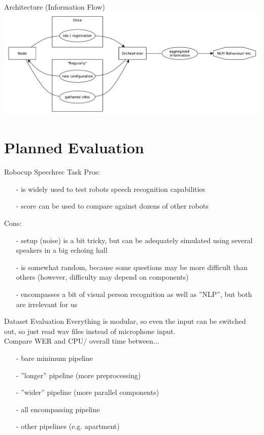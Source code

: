 \documentclass{beamer}
\begin{document}
	\begin{frame}{Architecture (Information Flow)}
		\centering
		\includegraphics[width=\textwidth]{Bilder/orchestrator}
	\end{frame}
	
	
	
	
	
	
	
	
	\section{Planned Evaluation}
	
	\begin{frame}{Robocup Speechrec Task}
		\pause
		Pros:
		\begin{itemize}
			\item[-] is widely used to test robots speech recognition capabilities
			\item[-] score can be used to compare against dozens of other robots
		\end{itemize}
		\pause
		Cons:
		\begin{itemize}
			\item[-] setup (noise) is a bit tricky, but can be adequately simulated using several speakers in a big echoing hall
			\item[-] is somewhat random, because some questions may be more difficult than others (however, difficulty may depend on components)
			\item[-] encompasses a bit of visual person recognition as well as ''NLP'', but both are irrelevant for us
		\end{itemize}
	\end{frame}
	
	\begin{frame}{Dataset Evaluation}
		Everything is modular, so even the input can be switched out, so just read wav files instead of microphone input.\\

		Compare WER and CPU/ overall time between...
		\begin{itemize}
			\item[-] bare minimum pipeline
			\item[-] ''longer'' pipeline (more preprocessing)
			\item[-] ''wider'' pipeline (more parallel components)
			\item[-] all encompassing pipeline
			\item[-] other pipelines (e.g. apartment)
		\end{itemize}
	\end{frame}
	
\end{document}
